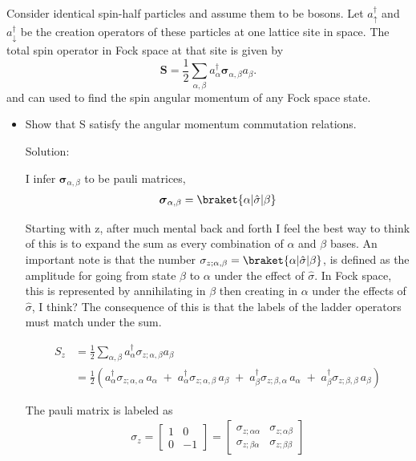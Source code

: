 \begin{homeworkProblem}
    Consider identical spin-half particles and assume them to be bosons. Let $a_{\uparrow}^{\dagger}$ and $a_{\downarrow}^{\dagger}$ be the creation operators of these particles at one lattice site in space. The total spin operator in Fock space at that site is given by
    $$
    \mathbf{S}=\frac{1}{2} \sum_{\alpha, \beta} a_\alpha^{\dagger} \boldsymbol{\sigma}_{\alpha, \beta} a_\beta .
    $$
    and can used to find the spin angular momentum of any Fock space state.
    \begin{itemize}
        \item[(a)] Show that S satisfy the angular momentum commutation relations.
            \begin{callout}{Solution:}

                I infer $\boldsymbol{\sigma}_{\alpha,\beta}$ to be pauli matrices,
                \begin{align*}
                    \boldsymbol{\sigma}_{\alpha,\beta} = \braket{\alpha|\hat{\sigma}|\beta}
                \end{align*}

                Starting with z, after much mental back and forth I feel the best way to think of this is to expand the sum as every combination of $\alpha$ and $\beta$ bases. An important note is that the number $\sigma_{z;\alpha, \beta}=\braket{\alpha|\hat{\sigma}|\beta}$, is defined as the amplitude for going from state $\beta$ to $\alpha$ under the effect of $\hat{\sigma}$. In Fock space, this is represented by annihilating in $\beta$ then creating in $\alpha$ under the effects of $\hat{\sigma}$, I think? The consequence of this is that the labels of the ladder operators must match under the sum.

                \begin{align*}
                    S_z &= \frac{1}{2} \sum_{\alpha,\beta} a_{\alpha}^{\dagger} \sigma_{z;\alpha,\beta} a_{\beta} \\
                        &= \frac{1}{2} \left( a_{\alpha}^{\dagger} \sigma_{z;\alpha,\alpha}\, a_{\alpha} \;+\; a_{\alpha}^{\dagger} \sigma_{z;\alpha,\beta}\, a_{\beta} \;+\; a_{\beta}^{\dagger} \sigma_{z;\beta,\alpha}\, a_{\alpha} \;+\; a_{\beta}^{\dagger} \sigma_{z;\beta,\beta}\, a_{\beta}\right)
                \end{align*}

                The pauli matrix is labeled as
                \begin{align*}
                    \sigma_z = \begin{bmatrix} 1 & 0 \\ 0 & -1 \end{bmatrix} = \begin{bmatrix} \sigma_{z;\alpha\alpha} & \sigma_{z;\alpha\beta} \\ \sigma_{z;\beta\alpha} & \sigma_{z;\beta\beta} \end{bmatrix}
                \end{align*}


\end{callout}
\end{itemize}
\end{homeworkProblem}
